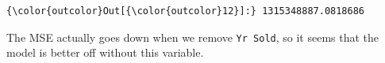 \documentclass[11pt]{article}
\begin{document}
\begin{Verbatim}[commandchars=\\\{\}]
{\color{outcolor}Out[{\color{outcolor}12}]:} 1315348887.0818686
\end{Verbatim}
            
    The MSE actually goes down when we remove \texttt{Yr\ Sold}, so it seems
that the model is better off without this variable.


    
    
    
    
\end{document}
